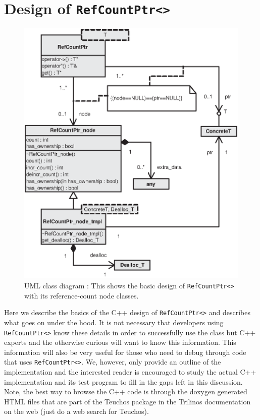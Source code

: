 %
\section{Design of \texttt{Ref\-Count\-Ptr<>}}
\label{rcp:apdx:design}
%

{\bsinglespace
\begin{figure}
\begin{center}
\includegraphics*[bb= 0.0in 0.0in 4.5in 5.3in,scale=1.0
]{RefCountPtrClassDiagram}
\end{center}
{}\caption{ {}\label{rcp:fig:rcp-class-diagram} UML class diagram :
This shows the basic design of {}\texttt{Ref\-Count\-Ptr<>} with its
reference-count node classes.  }
\end{figure}
\esinglespace}

Here we describe the basics of the C++ design of
{}\texttt{Ref\-Count\-Ptr<>} and describes what goes on under the
hood.  It is not necessary that developers using
{}\texttt{Ref\-Count\-Ptr<>} know these details in order to
successfully use the class but C++ experts and the otherwise curious
will want to know this information.  This information will also be
very useful for those who need to debug through code that uses
{}\texttt{Ref\-Count\-Ptr<>}.  We, however, only provide an outline of
the implementation and the interested reader is encouraged to study
the actual C++ implementation and its test program to fill in the gaps
left in this discussion.  Note, the best way to browse the C++ code is
through the doxygen generated HTML files that are part of the Teuchos
package in the Trilinos documentation on the web (just do a web search
for Teuchos).

